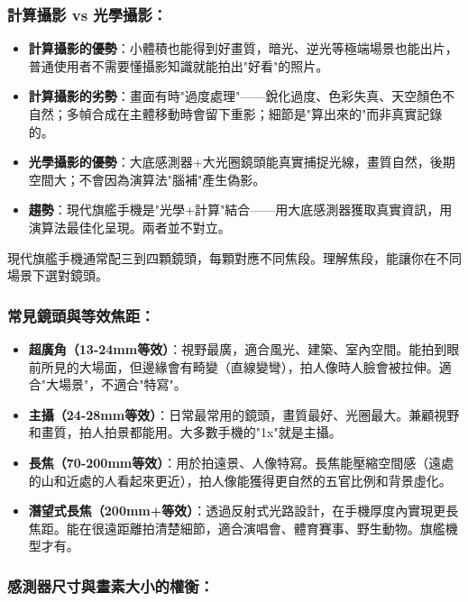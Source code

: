 \subsubsection*{計算攝影 vs 光學攝影：}

\begin{itemize}
  \item \textbf{計算攝影的優勢}：小體積也能得到好畫質，暗光、逆光等極端場景也能出片，普通使用者不需要懂攝影知識就能拍出"好看"的照片。
  \item \textbf{計算攝影的劣勢}：畫面有時"過度處理"——銳化過度、色彩失真、天空顏色不自然；多幀合成在主體移動時會留下重影；細節是"算出來的"而非真實記錄的。
  \item \textbf{光學攝影的優勢}：大底感測器+大光圈鏡頭能真實捕捉光線，畫質自然，後期空間大；不會因為演算法"腦補"產生偽影。
  \item \textbf{趨勢}：現代旗艦手機是"光學+計算"結合——用大底感測器獲取真實資訊，用演算法最佳化呈現。兩者並不對立。
\end{itemize}


現代旗艦手機通常配三到四顆鏡頭，每顆對應不同焦段。理解焦段，能讓你在不同場景下選對鏡頭。

\subsubsection*{常見鏡頭與等效焦距：}

\begin{itemize}
  \item \textbf{超廣角（13-24mm等效）}：視野最廣，適合風光、建築、室內空間。能拍到眼前所見的大場面，但邊緣會有畸變（直線變彎），拍人像時人臉會被拉伸。適合"大場景"，不適合"特寫"。
  \item \textbf{主攝（24-28mm等效）}：日常最常用的鏡頭，畫質最好、光圈最大。兼顧視野和畫質，拍人拍景都能用。大多數手機的"1x"就是主攝。
  \item \textbf{長焦（70-200mm等效）}：用於拍遠景、人像特寫。長焦能壓縮空間感（遠處的山和近處的人看起來更近），拍人像能獲得更自然的五官比例和背景虛化。
  \item \textbf{潛望式長焦（200mm+等效）}：透過反射式光路設計，在手機厚度內實現更長焦距。能在很遠距離拍清楚細節，適合演唱會、體育賽事、野生動物。旗艦機型才有。
\end{itemize}

\subsubsection*{感測器尺寸與畫素大小的權衡：}

